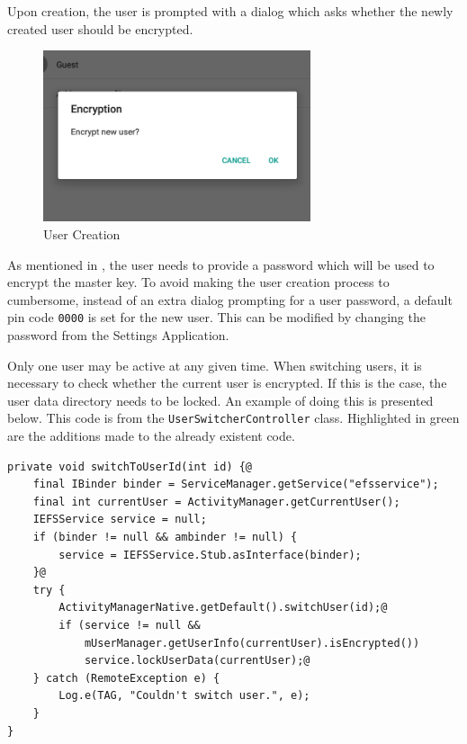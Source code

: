 Upon creation, the user is prompted with a dialog which asks whether the newly created user should be encrypted.

\begin{figure}[h!]
\centering
    \includegraphics[width=0.7\textwidth]{src/img/multi-user/newuser.png}
\caption{User Creation}
\end{figure}

As mentioned in , the user needs to provide a password which will be used to encrypt the master key. To avoid making the user creation process to cumbersome, instead of an extra dialog prompting for a user password, a default pin code \texttt{0000} is set for the new user. This can be modified by changing the password from the Settings Application.

Only one user may be active at any given time. When switching users, it is necessary to check whether the current user is encrypted. If this is the case, the user data directory needs to be locked. An example of doing this is presented below. This code is from the \texttt{UserSwitcherController} class. Highlighted in green are the additions made to the already existent code.


\begin{lstlisting}[style=custom2]
private void switchToUserId(int id) {@
	final IBinder binder = ServiceManager.getService("efsservice");
	final int currentUser = ActivityManager.getCurrentUser();
	IEFSService service = null;
	if (binder != null && ambinder != null) {
		service = IEFSService.Stub.asInterface(binder);
	}@
	try {
		ActivityManagerNative.getDefault().switchUser(id);@
		if (service != null &&
		    mUserManager.getUserInfo(currentUser).isEncrypted())
			service.lockUserData(currentUser);@
	} catch (RemoteException e) {
		Log.e(TAG, "Couldn't switch user.", e);
	}
}
\end{lstlisting}


